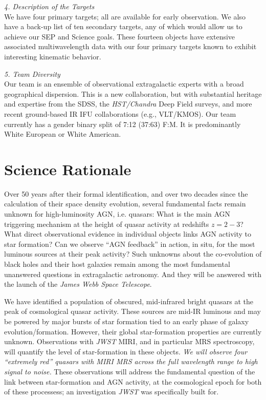 \smallskip 
\smallskip \smallskip
\noindent
{\it 4. Description of the Targets}\\
We have four primary targets; all are available for early observation.
We also have a back-up list of ten secondary targets, any of which would 
allow us to achieve our SEP and Science goals. These fourteen objects have 
extensive associated 
multiwavelength data with our four primary targets known 
to exhibit interesting kinematic behavior. 


\smallskip 
\smallskip \smallskip
\noindent
{\it 5. Team Diversity}\\
Our team is an ensemble of observational extragalactic experts with a
broad geographical dispersion. This is a new collaboration, but with
substantial heritage and expertise from the SDSS, the {\it
HST/Chandra} Deep Field surveys, and more recent ground-based IR IFU
collaborations (e.g., VLT/KMOS).  Our team currently has a gender binary split
of 7:12 (37:63) F:M. It is predominantly White European or White American.


\section*{Science Rationale}
\vspace{-6pt}
\noindent
Over 50 years after their formal identification, and over two decades
since the calculation of their space density evolution, several
fundamental facts remain unknown for high-luminosity AGN,
i.e. quasars: What is the main AGN triggering mechanism at the height
of quasar activity at redshifts $z=2-3$? What direct observational
evidence in individual objects links AGN activity to star formation?
Can we observe ``AGN feedback'' in action, in situ, for the most
luminous sources at their peak activity?  Such unknowns about the
co-evolution of black holes and their host galaxies remain among the
most fundamental unanswered questions in extragalactic astronomy.  And
they will be answered with the launch of the {\it James Webb Space
Telescope}.

\smallskip \smallskip
\noindent
We have identified a population of obscured, mid-infrared bright
quasars at the peak of cosmological quasar activity.  These sources
are mid-IR luminous and may be powered by major bursts of star
formation tied to an early phase of galaxy
evolution/formation. However, their global star-formation properties
are currently unknown.  Observations with {\it JWST} MIRI, and in
particular MRS spectroscopy, will quantify the level of star-formation
in these objects.  {\it We will observe four ``extremely red'' quasars
with MIRI MRS across the full wavelength range to high signal to
noise.} These observations will address the fundamental question of
the link between star-formation and AGN activity, at the cosmological
epoch for both of these processess; an investigation {\it JWST} was
specifically built for.

